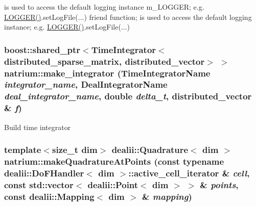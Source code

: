 is used to access the default logging instance m\_\-LOGGER; e.g. \hyperlink{namespacenatrium_addbc7112675b740db86c1c775fce7b1d}{LOGGER()}.setLogFile(...) friend function; is used to access the default logging instance; e.g. \hyperlink{namespacenatrium_addbc7112675b740db86c1c775fce7b1d}{LOGGER()}.setLogFile(...) \hypertarget{namespacenatrium_aaa8bf70405092ec81a8b15331a8f24b5}{
\subsubsection[{make\_\-integrator}]{\setlength{\rightskip}{0pt plus 5cm}boost::shared\_\-ptr$<${\bf TimeIntegrator}$<${\bf distributed\_\-sparse\_\-matrix}, {\bf distributed\_\-vector}$>$ $>$ natrium::make\_\-integrator (TimeIntegratorName {\em integrator\_\-name}, \/  DealIntegratorName {\em deal\_\-integrator\_\-name}, \/  double {\em delta\_\-t}, \/  distributed\_\-vector \& {\em f})}}
\label{namespacenatrium_aaa8bf70405092ec81a8b15331a8f24b5}


Build time integrator \hypertarget{namespacenatrium_a27247bfe7bab81b738081b41113ed419}{
\subsubsection[{makeQuadratureAtPoints}]{\setlength{\rightskip}{0pt plus 5cm}template$<$size\_\-t dim$>$ dealii::Quadrature$<$ dim $>$ natrium::makeQuadratureAtPoints (const typename dealii::DoFHandler$<$ dim $>$::active\_\-cell\_\-iterator \& {\em cell}, \/  const std::vector$<$ dealii::Point$<$ dim $>$ $>$ \& {\em points}, \/  const dealii::Mapping$<$ dim $>$ \& {\em mapping})}}
\label{namespacenatrium_a27247bfe7bab81b738081b41113ed419}


